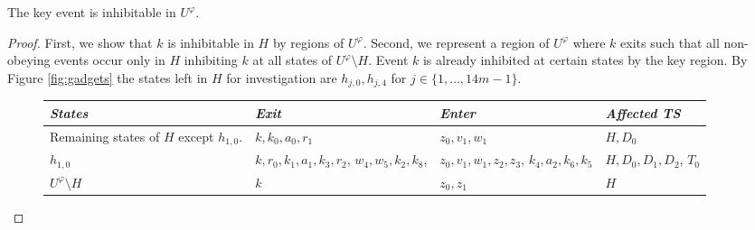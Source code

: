 \documentclass[english]{lipics_hacked}
\begin{document}
\begin{lemma}
\label{lemma:key}
The key event is inhibitable in $U^\varphi$.
\end{lemma}
%
\begin{proof}
First, we show that $k$ is inhibitable in $H$ by regions of $U^\varphi$.
Second, we represent a region of $U^\varphi$ where $k$ exits such that all non-obeying events occur only in $H$ inhibiting $k$ at all states of $U^\varphi\setminus H$.
Event $k$ is already inhibited at certain states by the key region.
By Figure \ref{fig:gadgets} the states left in $H$ for investigation are $h_{j,0},h_{j,4}$ for $j\in \{1,\dots,14m-1\}$.

\begin{figure}[H]
\centering
\begin{tabular}{ p{3cm}   p{3cm}    p{3cm}      p{3cm}  }
\textit{States} & \textit{Exit} & \textit{Enter} & \textit{Affected TS}  \\ \hline
Remaining states of $H$ except $h_{1,0}$. & $k, k_0,a_0,r_1$ & $z_0,v_1,w_1$ & $H,D_0$\\
$h_{1,0}$ & $k,r_0,k_1,a_1, k_3,r_2$, $w_4,w_5,k_2,k_8$, & $z_0,v_1,w_1,z_2,z_3$, $k_4,a_2,k_6,k_5$	& $H,D_0,D_1,D_2$, $T_0$\\	
$U^\varphi\setminus H$	& $k$ & $z_0,z_1$ & $H$							
\end{tabular}
\end{figure}
\end{proof}
\end{document}
